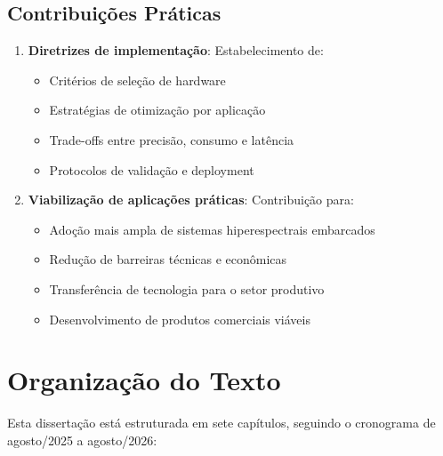 \subsection{Contribuições Práticas}
\begin{enumerate}
    \item \textbf{Diretrizes de implementação}: Estabelecimento de:
    \begin{itemize}
        \item Critérios de seleção de hardware
        \item Estratégias de otimização por aplicação
        \item Trade-offs entre precisão, consumo e latência
        \item Protocolos de validação e deployment
    \end{itemize}
    
    \item \textbf{Viabilização de aplicações práticas}: Contribuição para:
    \begin{itemize}
        \item Adoção mais ampla de sistemas hiperespectrais embarcados
        \item Redução de barreiras técnicas e econômicas
        \item Transferência de tecnologia para o setor produtivo
        \item Desenvolvimento de produtos comerciais viáveis
    \end{itemize}
\end{enumerate}

\section{Organização do Texto}\label{sec:organizacao}

Esta dissertação está estruturada em sete capítulos, seguindo o cronograma de agosto/2025 a agosto/2026:

